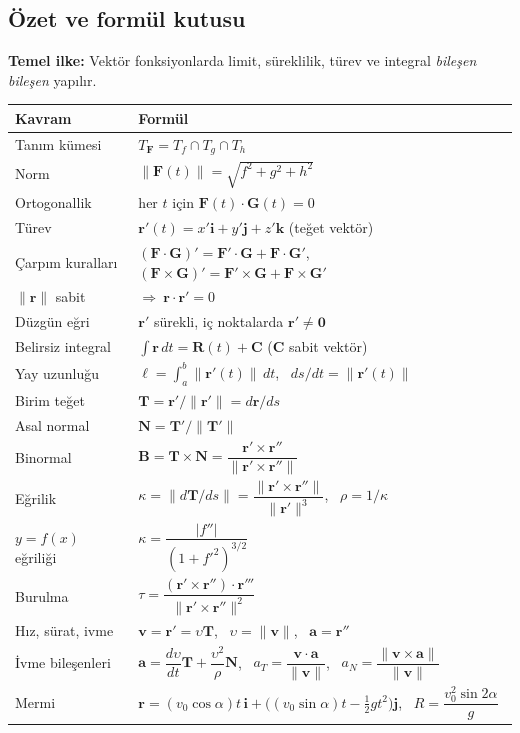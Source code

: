 \subsection{Özet ve formül kutusu}

\begin{ozet}
\textbf{Temel ilke:} Vektör fonksiyonlarda limit, süreklilik, türev ve integral \emph{bileşen bileşen} yapılır.
\begin{center}
\begin{tabular}{l l}
\toprule
Kavram & Formül \\
\midrule
Tanım kümesi & $T_{\mathbf F}=T_f\cap T_g\cap T_h$ \\
Norm & $\|\mathbf F(t)\|=\sqrt{f^2+g^2+h^2}$ \\
Ortogonallik & her $t$ için $\mathbf F(t)\cdot\mathbf G(t)=0$ \\
Türev & $\mathbf r'(t)=x'\mathbf i+y'\mathbf j+z'\mathbf k$ (teğet vektör) \\
Çarpım kuralları & $(\mathbf F\cdot\mathbf G)'=\mathbf F'\cdot\mathbf G+\mathbf F\cdot\mathbf G'$, \ $(\mathbf F\times\mathbf G)'=\mathbf F'\times\mathbf G+\mathbf F\times\mathbf G'$ \\
$\|\mathbf r\|$ sabit & $\Rightarrow\ \mathbf r\cdot\mathbf r'=0$ \\
Düzgün eğri & $\mathbf r'$ sürekli, iç noktalarda $\mathbf r'\neq\mathbf 0$ \\
Belirsiz integral & $\int\mathbf r\,dt=\mathbf R(t)+\mathbf C$ ($\mathbf C$ sabit vektör) \\
Yay uzunluğu & $\ell=\int_a^b\|\mathbf r'(t)\|\,dt$, \ $ds/dt=\|\mathbf r'(t)\|$ \\
Birim teğet & $\mathbf T=\mathbf r'/\|\mathbf r'\|=d\mathbf r/ds$ \\
Asal normal & $\mathbf N=\mathbf T'/\|\mathbf T'\|$ \\
Binormal & $\mathbf B=\mathbf T\times\mathbf N=\dfrac{\mathbf r'\times\mathbf r''}{\|\mathbf r'\times\mathbf r''\|}$ \\
Eğrilik & $\kappa=\|d\mathbf T/ds\|=\dfrac{\|\mathbf r'\times\mathbf r''\|}{\|\mathbf r'\|^3}$, \ $\rho=1/\kappa$ \\
$y=f(x)$ eğriliği & $\kappa=\dfrac{|f''|}{(1+f'^2)^{3/2}}$ \\
Burulma & $\tau=\dfrac{(\mathbf r'\times\mathbf r'')\cdot\mathbf r'''}{\|\mathbf r'\times\mathbf r''\|^2}$ \\
Hız, sürat, ivme & $\mathbf v=\mathbf r'=\upsilon\mathbf T$, \ $\upsilon=\|\mathbf v\|$, \ $\mathbf a=\mathbf r''$ \\
İvme bileşenleri & $\mathbf a=\dfrac{d\upsilon}{dt}\mathbf T+\dfrac{\upsilon^2}{\rho}\mathbf N$, \ $a_T=\dfrac{\mathbf v\cdot\mathbf a}{\|\mathbf v\|}$, \ $a_N=\dfrac{\|\mathbf v\times\mathbf a\|}{\|\mathbf v\|}$ \\
Mermi & $\mathbf r=(v_0\cos\alpha)t\,\mathbf i+\big((v_0\sin\alpha)t-\tfrac12gt^2\big)\mathbf j$, \ $R=\dfrac{v_0^2\sin2\alpha}{g}$ \\
\bottomrule
\end{tabular}
\end{center}


\end{ozet}
